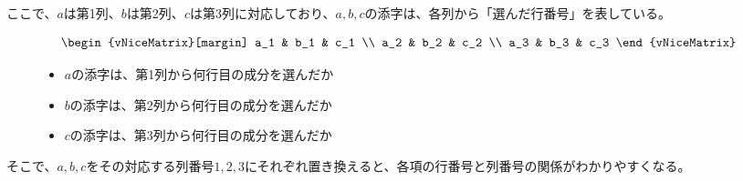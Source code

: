 \documentclass[../../../topic_linear-algebra]{subfiles}
\begin{document}
\br

ここで、$a$は第1列、$b$は第2列、$c$は第3列に対応しており、$a, b, c$の添字は、各列から「選んだ行番号」を表している。

\br

\begin{figure}[h]
  \begin{minipage}{0.33\linewidth}
    \begin{equation*}
      \begin{vNiceMatrix}[margin]
        a_1 & b_1 & c_1 \\
        a_2 & b_2 & c_2 \\
        a_3 & b_3 & c_3
      \end{vNiceMatrix}
    \end{equation*}
  \end{minipage}
  \begin{minipage}{0.66\linewidth}
    \begin{itemize}
      \item $a$の添字は、第1列から何行目の成分を選んだか
      \item $b$の添字は、第2列から何行目の成分を選んだか
      \item $c$の添字は、第3列から何行目の成分を選んだか
    \end{itemize}
  \end{minipage}
\end{figure}

\br

そこで、$a,b,c$をその対応する列番号$1, 2, 3$にそれぞれ置き換えると、各項の行番号と列番号の関係がわかりやすくなる。
\end{document}
